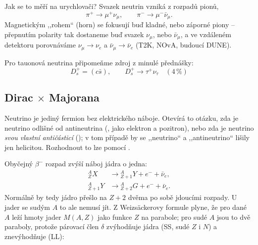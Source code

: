 Jak se to měří na urychlovači? Svazek neutrin vzniká z rozpadů pionů,
\[
  \pi^+\to\mu^+\nu_\mu,\qquad \pi^-\to\mu^-\bar\nu_\mu .
\]
Magnetickým ,,rohem`` (horn) se fokusují buď kladné, nebo záporné piony -- přepnutím
polarity tak dostaneme buď svazek \(\nu_\mu\), nebo \(\bar\nu_\mu\), a ve vzdáleném detektoru
porovnáváme \(\nu_\mu\to\nu_e\) a \(\bar\nu_\mu\to\bar\nu_e\) (T2K, NOvA, budoucí DUNE).

Pro tauonová neutrina připomeňme zdroj z minulé přednášky:
\[
  D_s^+ = (c\bar s),\qquad D_s^+\to\tau^+\nu_\tau \quad (4\,\%)
\]

\subsection{Dirac \texorpdfstring{$\times$}{x} Majorana}

Neutrino je jediný fermion bez elektrického náboje. Otevírá to otázku, zda je neutrino
odlišné od antineutrina (, jako elektron a pozitron), nebo zda je
neutrino \emph{svou vlastní antičásticí} (); v tom případě by se
,,neutrino`` a ,,antineutrino`` lišily jen helicitou. Rozhodnout to lze pomocí
.

Obyčejný \(\beta^-\) rozpad zvýší náboj jádra o jedna:
\begin{align*}
  {}^{A}_{Z}X &\to {}^{A}_{Z+1}Y + e^- + \bar\nu_e ,\\
  {}^{A}_{Z+1}Y &\to {}^{A}_{Z+2}G + e^- + \bar\nu_e .
\end{align*}
Normálně by tedy jádro přešlo na \(Z+2\) dvěma po sobě jdoucími rozpady. U jader se sudým
\(A\) to ale nemusí jít. Z Weizsäckerovy formule plyne, že pro dané \(A\) leží hmoty jader
\(M(A,Z)\) jako funkce \(Z\) na parabole; pro sudé \(A\) jsou to dvě paraboly, protože párovací
člen \(\delta\) zvýhodňuje jádra  (SS, sudé \(Z\) i \(N\)) a znevýhodňuje
 (LL):

